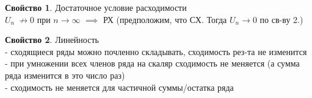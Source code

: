 \documentclass[11pt,a4paper]{article}
\theoremstyle{definition}
\newtheorem{sv}{Свойство}
\begin{document}
\par
\begin{sv}
    Достаточное условие расходимости\\
    \(U_n\ \not\to 0\) при \(n\to\infty\) \(\implies\) РХ (предположим, что СХ. Тогда $U_n\to 0$ по св-ву 2.)

\end{sv}
\par
\begin{sv}
    Линейность\\
    - сходящиеся ряды можно почленно складывать, сходимость рез-та не изменится\\
    - при умножении всех членов ряда на скаляр сходимость не меняется (а сумма ряда изменится в это число раз)\\
    - сходимость не меняется для частичной суммы/остатка ряда
\end{sv}
\end{document}
